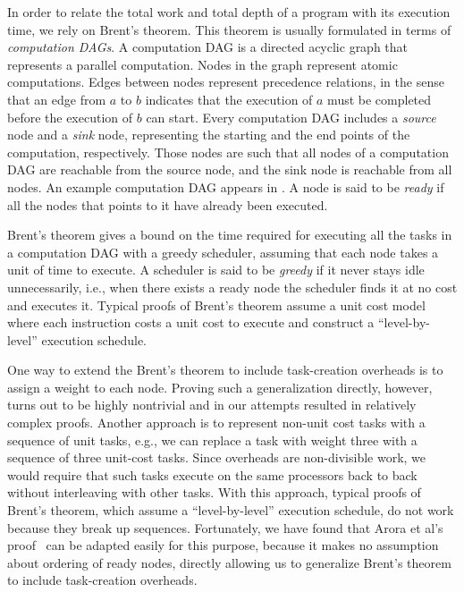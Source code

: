 In order to relate the total work and total depth of a program with
its execution time, we rely on Brent's theorem. This theorem is
usually formulated in terms of {\em computation DAGs}. 
%
%
%
%
A computation DAG is a directed acyclic graph that represents a
parallel computation. Nodes in the graph represent atomic
computations.  Edges between nodes represent precedence relations, in
the sense that an edge from $a$ to $b$ indicates that the execution of
$a$ must be completed before the execution of $b$ can start.  Every
computation DAG includes a {\em source} node and a {\em sink} node,
representing the starting and the end points of the computation,
respectively.  Those nodes are such that all nodes of a computation
DAG are reachable from the source node, and the sink node is reachable
from all nodes.  An example computation DAG appears in .
A node is said to be {\em ready} if all the nodes that points to it
have already been executed.

Brent's theorem gives a bound on the time required for executing all
the tasks in a computation DAG with a greedy scheduler, assuming that
each node takes a unit of time to execute. A scheduler is said to be
{\em greedy} if it never stays idle unnecessarily, i.e., when there
exists a ready node the scheduler finds it at no cost and executes
it.  Typical proofs of Brent's theorem assume a unit cost model where
each instruction costs a unit cost to execute and construct a
``level-by-level'' execution schedule.  


One way to extend the Brent's theorem to include task-creation
overheads is to assign a weight to each node. Proving such a
generalization directly, however, turns out to be highly nontrivial
and in our attempts resulted in relatively complex proofs.  Another
approach is to represent non-unit cost tasks with a sequence of unit
tasks, e.g., we can replace a task with weight three with a sequence
of three unit-cost tasks.  Since overheads are non-divisible work, we
would require that such tasks execute on the same processors back to
back without interleaving with other tasks.  With this approach,
typical proofs of Brent's theorem, which assume a ``level-by-level''
execution schedule, do not work because they break up
sequences. Fortunately, we have found that Arora et al's
proof~\cite{AroraBlPl98} can be adapted easily for this purpose,
because it makes no assumption about ordering of ready nodes, directly
allowing us to generalize Brent's theorem to include task-creation
overheads.

